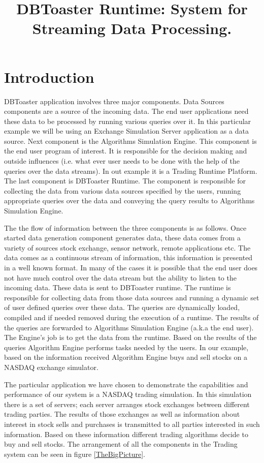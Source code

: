 \documentclass[11pt]{article}
\begin{document}
	
\title{DBToaster Runtime: System for Streaming Data Processing.}
\author{}
\maketitle

\section{Introduction}

DBToaster application involves three major components. Data Sources components are a source of the incoming data. The end user applications need these data to be processed by running various queries over it. In this particular example we will be using an Exchange Simulation Server application as a data source. Next component is the Algorithms Simulation Engine. This component is the end user program of interest. It is responsible for the decision making and outside influences (i.e. what ever user needs to be done with the help of the queries over the data streams). In out example it is a Trading Runtime Platform. The last component is DBToaster Runtime. The component is responsible for collecting the data from various data sources specified by the users, running appropriate queries over the data and conveying the query results to Algorithms Simulation Engine. 

The the flow of information between the three components is as follows. Once started data generation component generates data, these data comes from a variety of sources stock exchange, sensor network, remote applications etc. The data comes as a continuous stream of information, this information is presented in a well known format. In many of the cases it is possible that the end user does not have much control over the data stream but the ability to listen to the incoming data. These data is sent to DBToaster runtime. The runtime is responsible for collecting data from those data sources and running a dynamic set of user defined queries over these data. The queries are dynamically loaded, compiled and if needed removed during the execution of a runtime. The results of the queries are forwarded to Algorithms Simulation Engine (a.k.a the end user). The Engine's job is to get the data from the runtime. Based on the results of the queries Algorithm Engine performs tasks needed by the users. In our example, based on the information received Algorithm Engine buys and sell stocks on a NASDAQ exchange simulator. 

The particular application we have chosen to demonstrate the capabilities and performance of our system is a NASDAQ trading simulation. In this simulation there is a set of servers; each server arranges stock exchanges between different trading parties. The results of those exchanges as well as information about interest in stock sells and purchases is transmitted to all parties interested in such information. Based on these information different trading algorithms decide to buy and sell stocks. The arrangement of all the components in the Trading system can be seen in figure \ref{TheBigPicture}. 
\end{document}
